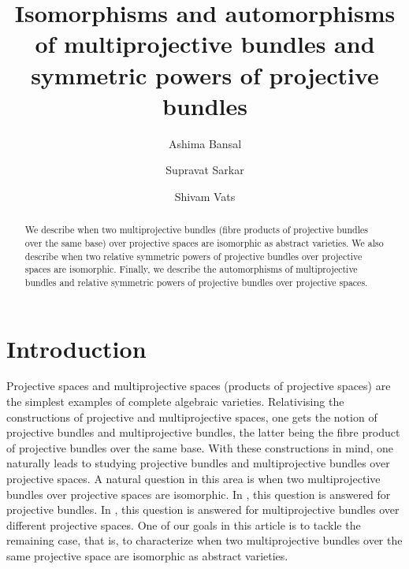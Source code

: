 \documentclass[12pt,reqno]{amsart}
\theoremstyle{definition}
\numberwithin{equation}{section}
\begin{document}
\title[Multiprojective bundles and Symmetric powers]{Isomorphisms and automorphisms of multiprojective bundles and symmetric powers of projective bundles}
\author[A. Bansal]{Ashima Bansal}
\address{Indian Institute of Science Education and Research Tirupati, Srinivasapuram, Yerpedu Mandal, Tirupati Dist, Andhra Pradesh, India – 517619.}
\author[S. Sarkar]{Supravat Sarkar}
\address{\scshape Fine Hall, Princeton, NJ 700108}
\author[S. Vats]{Shivam Vats}
\address{}

\begin{abstract}
We describe when two multiprojective bundles (fibre products of projective bundles over the same base) over projective spaces are isomorphic as abstract varieties. We also describe when two relative symmetric powers of projective bundles over projective spaces are isomorphic. Finally, we describe the automorphisms of multiprojective bundles and relative symmetric powers of projective bundles over projective spaces.
\end{abstract}
\maketitle
\section{Introduction}
\noindent Projective spaces and multiprojective spaces (products of projective spaces) are the simplest examples of complete algebraic varieties. Relativising the constructions of projective and multiprojective spaces, one gets the notion of projective bundles and multiprojective bundles, the latter being the fibre product of projective bundles over the same base. With these constructions in mind, one naturally leads to studying projective bundles and multiprojective bundles over projective spaces. A natural question in this area is when two multiprojective bundles over projective spaces are isomorphic. In \cite{Sa}, this question is answered for projective bundles. In {\cite[Theorem B]{BSV1}}, this question is answered for multiprojective bundles over different projective spaces. One of our goals in this article is to tackle the remaining case, that is, to characterize when two multiprojective bundles over the same projective space are isomorphic as abstract varieties.
\end{document}

